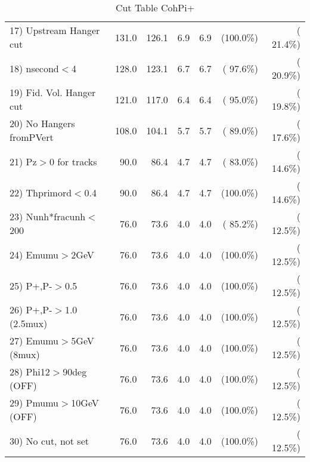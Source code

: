 \begin{table}[h!]
\begin{tabular}{||l||r|r|r|r|r|r||}
 17) Upstream Hanger cut  &        131.0 &        126.1 &          6.9 &          6.9 & (100.0\%) & ( 21.4\%) \\
 18) nsecond$<$4          &        128.0 &        123.1 &          6.7 &          6.7 & ( 97.6\%) & ( 20.9\%) \\
 19) Fid. Vol. Hanger cut &        121.0 &        117.0 &          6.4 &          6.4 & ( 95.0\%) & ( 19.8\%) \\
 20) No Hangers fromPVert &        108.0 &        104.1 &          5.7 &          5.7 & ( 89.0\%) & ( 17.6\%) \\
 21) Pz$>$0 for tracks    &         90.0 &         86.4 &          4.7 &          4.7 & ( 83.0\%) & ( 14.6\%) \\
 22) Thprimord$<$0.4      &         90.0 &         86.4 &          4.7 &          4.7 & (100.0\%) & ( 14.6\%) \\
 23) Nunh*fracunh$<$200   &         76.0 &         73.6 &          4.0 &          4.0 & ( 85.2\%) & ( 12.5\%) \\
 24) Emumu$>$2GeV         &         76.0 &         73.6 &          4.0 &          4.0 & (100.0\%) & ( 12.5\%) \\
 25) P+,P-$>$0.5          &         76.0 &         73.6 &          4.0 &          4.0 & (100.0\%) & ( 12.5\%) \\
 26) P+,P-$>$1.0 (2.5mux) &         76.0 &         73.6 &          4.0 &          4.0 & (100.0\%) & ( 12.5\%) \\
 27) Emumu$>$5GeV  (8mux) &         76.0 &         73.6 &          4.0 &          4.0 & (100.0\%) & ( 12.5\%) \\
 28) Phi12$>$90deg  (OFF) &         76.0 &         73.6 &          4.0 &          4.0 & (100.0\%) & ( 12.5\%) \\
 29) Pmumu$>$10GeV  (OFF) &         76.0 &         73.6 &          4.0 &          4.0 & (100.0\%) & ( 12.5\%) \\
 30) No cut, not set      &         76.0 &         73.6 &          4.0 &          4.0 & (100.0\%) & ( 12.5\%) \\
 \hline
 \hline
 \end{tabular}
 \caption{Cut Table  CohPi+   }
 \label{tab-cutcohjpsi-mumu_nuecc}
 \end{table}
